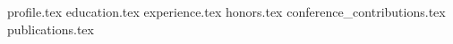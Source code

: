\documentclass[11pt, a4paper]{awesome-cv}
\newcommand*{\sectiondir}{resume/}
\begin{document}

\makecvheader
% 

{profile.tex}
{education.tex}
{experience.tex}
{honors.tex}
{conference_contributions.tex}
{publications.tex}
\end{document}
